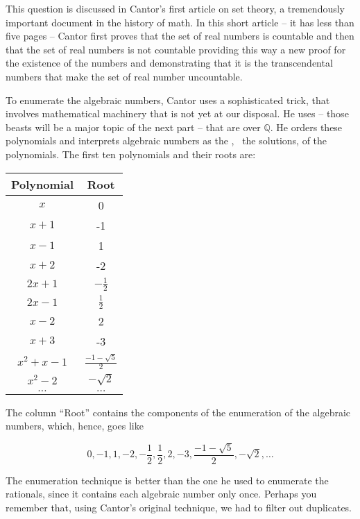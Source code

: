\documentclass[tikz]{scrreprt}
\begin{document}
This question is discussed in Cantor's first article
on set theory, a tremendously important document
in the history of math.
In this short article -- it has less than five pages --
Cantor first proves that the set of real
 numbers is countable and then
that the set of real numbers is not countable
providing this way a new proof for the existence
of the  numbers
and demonstrating that it is the transcendental numbers
that make the set of real number uncountable.

To enumerate the algebraic numbers,
Cantor uses a sophisticated trick, that
involves mathematical machinery that is not yet
at our disposal. He uses  --
those beasts will be a major topic of the next part --
that are  over $\mathbb{Q}$.
He orders these polynomials and interprets
algebraic numbers as the ,
\ie\ the solutions, of the polynomials.
The first ten polynomials and their roots are:

\begin{center}
\begingroup
\renewcommand{\arraystretch}{1.5}
\begin{tabular}{|c|c|}
\hline
Polynomial & Root \\\hline\hline
$x$       & 0  \\\hline
$x+1$     & -1 \\\hline
$x-1$     & 1   \\\hline
$x+2$     & -2  \\\hline
$2x+1$    & $-\frac{1}{2}$ \\\hline
$2x-1$    & $\frac{1}{2}$  \\\hline
$x-2$     &  2             \\\hline
$x+3$     & -3             \\\hline
$x^2+x-1$ & $\frac{-1-\sqrt{5}}{2}$ \\\hline
$x^2-2$   & $-\sqrt{2}$ \\\hline
$\dots$   & $\dots$\\\hline
\end{tabular}
\endgroup
\end{center}

The column ``Root'' contains the components of the enumeration
of the algebraic numbers, which, hence, goes like

\[
0,-1,1,-2,-\frac{1}{2},\frac{1}{2},2,-3,\frac{-1-\sqrt{5}}{2},-\sqrt{2},\dots
\]

The enumeration technique is better than the one
he used to enumerate the rationals, since it contains
each algebraic number only once. Perhaps you remember
that, using Cantor's original technique, we had to
filter out duplicates.
\end{document}
